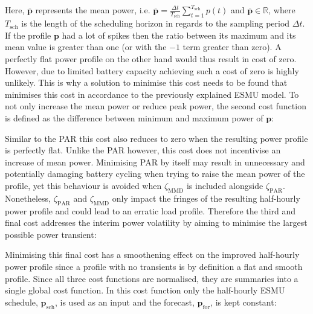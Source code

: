 Here, $\overline{\textbf{p}}$ represents the mean power, i.e. $\overline{\textbf{p}} = \frac{\Delta t}{T_\text{sch}}\sum_{t=1}^{T_\text{sch}}p(t)$ and $\overline{\textbf{p}} \in \mathbb{R}$, where $T_\text{sch}$ is the length of the scheduling horizon in regards to the sampling period $\Delta t$.
If the profile $\textbf{p}$ had a lot of spikes then the ratio between its maximum and its mean value is greater than one (or with the $-1$ term greater than zero).
A perfectly flat power profile on the other hand would thus result in cost of zero.
However, due to limited battery capacity achieving such a cost of zero is highly unlikely.
This is why a solution to minimise this cost needs to be found that minimises this cost in accordance to the previously explained ESMU model.
To not only increase the mean power or reduce peak power, the second cost function is defined as the difference between minimum and maximum power of $\textbf{p}$:




Similar to the PAR this cost also reduces to zero when the resulting power profile is perfectly flat.
Unlike the PAR however, this cost does not incentivise an increase of mean power.
Minimising PAR by itself may result in unnecessary and potentially damaging battery cycling when trying to raise the mean power of the profile, yet this behaviour is avoided when $\zeta_\text{MMD}$ is included alongside $\zeta_\text{PAR}$.
Nonetheless, $\zeta_\text{PAR}$ and $\zeta_\text{MMD}$ only impact the fringes of the resulting half-hourly power profile and could lead to an erratic load profile.
Therefore the third and final cost addresses the interim power volatility by aiming to minimise the largest possible power transient:




Minimising this final cost has a smoothening effect on the improved half-hourly power profile since a profile with no transients is by definition a flat and smooth profile.
Since all three cost functions are normalised, they are summaries into a single global cost function.
In this cost function only the half-hourly ESMU schedule, $\textbf{p}_\text{sch}$, is used as an input and the forecast, $\textbf{p}_\text{for}$, is kept constant:

